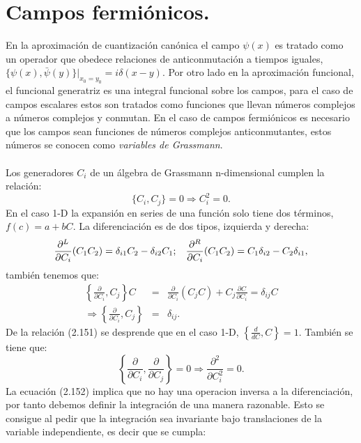 \section{Campos fermiónicos.}
En la aproximación de cuantización canónica el campo $\psi(x)$ es tratado como un operador que obedece relaciones de anticonmutación a tiempos iguales, $\{\psi(x),\bar{\psi}(y)\}|_{x_0=y_0}=i\delta (x-y)$. Por otro lado en la aproximación funcional, el funcional generatriz es una integral funcional sobre los campos, para el caso de campos escalares estos son tratados como funciones que llevan números complejos a números complejos y conmutan. En el caso de campos fermiónicos es necesario que los campos sean funciones de números complejos anticonmutantes, estos números se conocen como \textit{variables de Grassmann}.
\\
\\
Los generadores $C_i$ de un álgebra de Grassmann n-dimensional cumplen la relación:
\begin{equation}
\{C_i,C_j\}=0\Rightarrow C_i^2=0 .
\end{equation}
En el caso 1-D la expansión en series de una función solo tiene dos términos, $f(c)=a+bC$. La diferenciación es de dos tipos, izquierda y derecha:
\begin{equation}
\frac{\partial^{L}}{\partial C_{i}}(C_{1}C_{2})=\delta_{i1}C_{2}-\delta_{i2}C_{1};\hspace{0.3cm}\frac{\partial^{R}}{\partial C_{i}}(C_{1}C_{2})=C_{1}\delta_{i2}-C_{2}\delta_{i1},
\end{equation}
también tenemos que:
\begin{eqnarray}
\nonumber \left\{ \frac{\partial}{\partial C_{i}},C_{j}\right\} C&=&\frac{\partial}{\partial C_{i}}(C_{j}C)+C_{j}\frac{\partial C}{\partial C_{i}}=\delta_{ij}C\\
\Rightarrow \left\{ \frac{\partial}{\partial C_{i}},C_{j}\right\} &=& \delta_{ij}.
\end{eqnarray} 
De la relación (2.151) se desprende que en el caso 1-D, $\left\{ \frac{d}{dC},C\right\} =1$. También se tiene que:
\begin{equation}
\left\{ \frac{\partial}{\partial C_{i}},\frac{\partial}{\partial C_{j}}\right\} =0\Rightarrow\frac{\partial^{2}}{\partial C_{i}^{2}}=0 .
\end{equation}
La ecuación (2.152) implica que no hay una operacion inversa a la diferenciación, por tanto debemos definir la integración de una manera razonable. Esto se consigue al pedir que la integración sea invariante bajo translaciones de la variable independiente, es decir que se cumpla:
